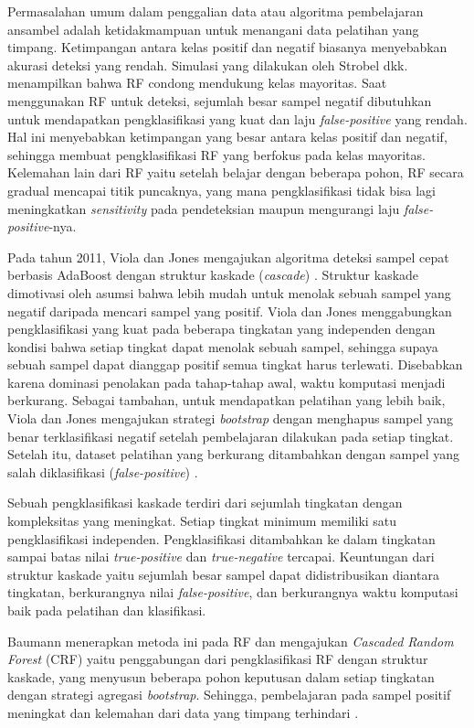 Permasalahan umum dalam penggalian data atau algoritma pembelajaran ansambel
adalah ketidakmampuan untuk menangani data pelatihan yang timpang.
Ketimpangan antara kelas positif dan negatif biasanya menyebabkan akurasi
deteksi yang rendah.
Simulasi yang dilakukan oleh Strobel dkk. \cite{strobl2007bias} menampilkan
bahwa RF condong mendukung kelas mayoritas.
Saat menggunakan RF untuk deteksi, sejumlah besar sampel negatif dibutuhkan
untuk mendapatkan pengklasifikasi yang kuat dan laju \textit{false-positive}
yang rendah.
Hal ini menyebabkan ketimpangan yang besar antara kelas positif dan
negatif, sehingga membuat pengklasifikasi RF yang berfokus pada kelas
mayoritas.
Kelemahan lain dari RF yaitu setelah belajar dengan beberapa pohon, RF secara
gradual mencapai titik puncaknya, yang mana pengklasifikasi tidak bisa lagi
meningkatkan \textit{sensitivity} pada pendeteksian maupun mengurangi laju
\textit{false-positive}-nya.

Pada tahun 2011, Viola dan Jones mengajukan algoritma deteksi sampel cepat
berbasis AdaBoost dengan struktur kaskade (\textit{cascade})
\cite{viola2004robust}.
Struktur kaskade dimotivasi oleh asumsi bahwa lebih mudah untuk menolak sebuah
sampel yang negatif daripada mencari sampel yang positif.
Viola dan Jones menggabungkan pengklasifikasi yang kuat pada beberapa tingkatan
yang independen dengan kondisi bahwa setiap tingkat dapat menolak sebuah
sampel, sehingga supaya sebuah sampel dapat dianggap positif semua tingkat
harus terlewati.
Disebabkan karena dominasi penolakan pada tahap-tahap awal, waktu komputasi
menjadi berkurang.
Sebagai tambahan, untuk mendapatkan pelatihan yang lebih baik, Viola dan Jones
mengajukan strategi \textit{bootstrap} dengan menghapus sampel yang benar
terklasifikasi negatif setelah pembelajaran dilakukan pada setiap tingkat.
Setelah itu, dataset pelatihan yang berkurang ditambahkan dengan sampel yang
salah diklasifikasi (\textit{false-positive})
\cite{viola2004robust}.

Sebuah pengklasifikasi kaskade terdiri dari sejumlah tingkatan dengan
kompleksitas yang meningkat.
Setiap tingkat minimum memiliki satu pengklasifikasi independen.
Pengklasifikasi ditambahkan ke dalam tingkatan sampai batas nilai
\textit{true-positive} dan \textit{true-negative} tercapai.
Keuntungan dari struktur kaskade yaitu sejumlah besar sampel dapat
didistribusikan diantara tingkatan, berkurangnya nilai \textit{false-positive},
dan berkurangnya waktu komputasi baik pada pelatihan dan klasifikasi.

Baumann menerapkan metoda ini pada RF dan mengajukan \textit{Cascaded Random
Forest} (CRF) yaitu penggabungan dari pengklasifikasi RF dengan struktur
kaskade, yang menyusun beberapa pohon keputusan dalam setiap tingkatan dengan
strategi agregasi \textit{bootstrap}.
Sehingga, pembelajaran pada sampel positif meningkat dan kelemahan dari data
yang timpang terhindari \cite{baumann2013cascaded}.


